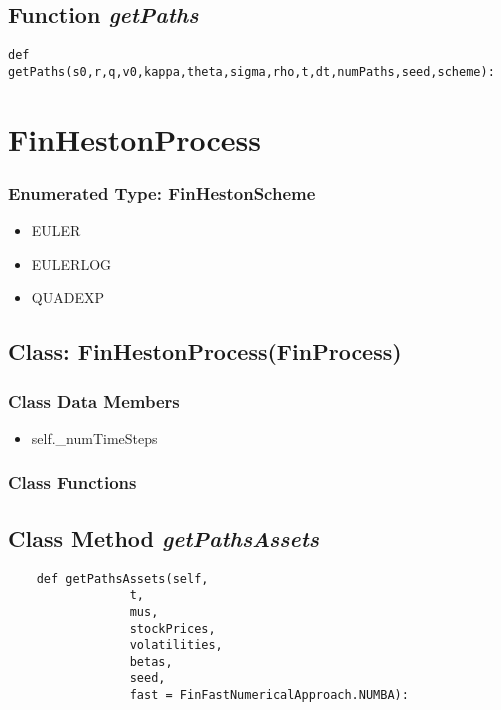 \documentclass[twoside,11pt]{book}
\begin{document}
\subsection{Function {\it getPaths}}


\begin{lstlisting}
def getPaths(s0,r,q,v0,kappa,theta,sigma,rho,t,dt,numPaths,seed,scheme):
\end{lstlisting}

\newpage
\section{FinHestonProcess}

\subsubsection{Enumerated Type: FinHestonScheme}
\begin{itemize}
\item{EULER}
\item{EULERLOG}
\item{QUADEXP}
\end{itemize}

\subsection{Class: FinHestonProcess(FinProcess)}


\subsubsection{Class Data Members}
\begin{itemize}
\item{self.\_numTimeSteps}
\end{itemize}

\subsubsection{Class Functions}

\subsection{Class Method {\it getPathsAssets}}


\begin{lstlisting}
    def getPathsAssets(self, 
                 t,
                 mus,
                 stockPrices,
                 volatilities,
                 betas,
                 seed, 
                 fast = FinFastNumericalApproach.NUMBA):
\end{lstlisting}
\end{document}

